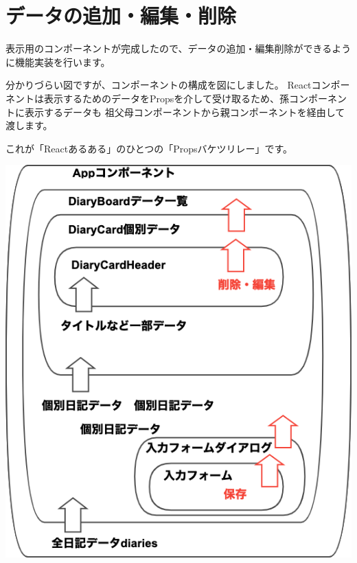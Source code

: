 \section{データの追加・編集・削除}
\keeplastskip{
  \label{sec:3-4}
  \label{sec-034hooks}
  \par\nobreak
}

表示用のコンポーネントが完成したので、データの追加・編集削除ができるように機能実装を行います。

\vspace*{\baselineskip}

分かりづらい図ですが、コンポーネントの構成を図にしました。
Reactコンポーネントは表示するためのデータをPropsを介して受け取るため、孫コンポーネントに表示するデータも
祖父母コンポーネントから親コンポーネントを経由して渡します。

\vspace*{\baselineskip}

これが「Reactあるある」のひとつの「Propsバケツリレー」です。

\begin{reviewimage}%
\includegraphics[width=1.0\maxwidth]{./images/03-todo-with-react/AppComponents.png}%
\label{image:03-todo-with-react:AppComponents}
\end{reviewimage}

